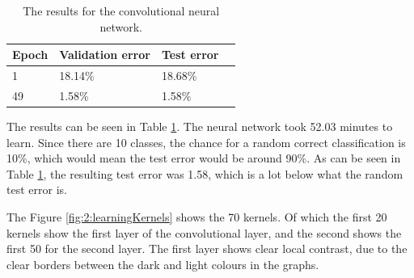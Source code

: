 \begin{table}[ht!]
\centering
\begin{tabular}{llll}
\textbf{Epoch} & \textbf{Validation error} & \textbf{Test error}\\ \hline
1              & 18.14\%                   & 18.68\%                       \\
49             & 1.58\%                    & 1.58\%                        \\                    
\end{tabular}
\caption{The results for the convolutional neural network.}
\label{results2}
\end{table}

The results can be seen in Table \ref{results2}. The neural network took 52.03 minutes to learn. Since there are 10 classes, the chance for a random correct classification is 10\%, which would mean the test error would be around 90\%. As can be seen in Table \ref{results2}, the resulting test error was 1.58, which is a lot below what the random test error is. 

The Figure \ref{fig:2:learningKernels} shows the 70 kernels. Of which the first 20 kernels show the first layer of the convolutional layer, and the second shows the first 50 for the second layer. The first layer shows clear local contrast, due to the clear borders between the dark and light colours in the graphs.

